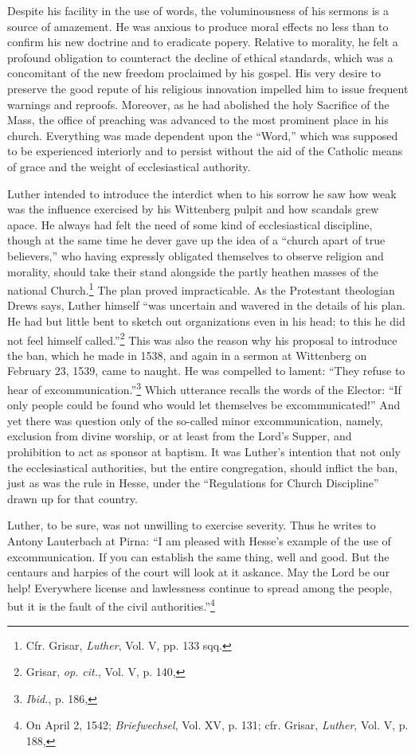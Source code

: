 Despite his facility in the use of words, the voluminousness of his
sermons is a source of amazement. He was anxious to produce moral
effects no less than to confirm his new doctrine and to eradicate popery.
Relative to morality, he felt a profound obligation to counteract the
decline of ethical standards, which was a concomitant of the
new freedom proclaimed by his gospel. His very desire to preserve the
good repute of his religious innovation impelled him to issue frequent
warnings and reproofs. Moreover, as he had abolished the holy Sacrifice
of the Mass, the office of preaching was advanced to the most
prominent place in his church. Everything was made dependent
upon the “Word,” which was supposed to be experienced interiorly
and to persist without the aid of the Catholic means of grace and the
weight of ecclesiastical authority.

Luther intended to introduce the interdict when to his sorrow he
saw how weak was the influence exercised by his Wittenberg pulpit
and how scandals grew apace. He always had felt the need of some
kind of ecclesiastical discipline, though at the same time he dever
gave up the idea of a “church apart of true believers,” who having
expressly obligated themselves to observe religion and morality,
should take their stand alongside the partly heathen masses of the
national Church.\footnote{Cfr. Grisar, \textit{Luther}, Vol. V, pp. 133 sqq.}
The plan proved impracticable. As the Protestant
theologian Drews says, Luther himself “was uncertain and
wavered in the details of his plan. He had but little bent to sketch out
organizations even in his head; to this he did not feel himself
called.”\footnote{Grisar, \textit{op. cit.}, Vol. V, p. 140,}
This was also the reason why his proposal to introduce the
ban, which he made in 1538, and again in a sermon at Wittenberg
on February 23, 1539, came to naught. He was compelled to lament:
“They refuse to hear of excommunication.”\footnote{\textit{Ibid.}, p. 186,}
Which utterance recalls
the words of the Elector: “If only people could be found who would
let themselves be excommunicated!” And yet there was question only
of the so-called minor excommunication, namely, exclusion from
divine worship, or at least from the Lord’s Supper, and prohibition to
act as sponsor at baptism. It was Luther’s intention that not only the
ecclesiastical authorities, but the entire congregation, should inflict the
ban, just as was the rule in Hesse, under the “Regulations for Church
Discipline” drawn up for that country.

Luther, to be sure, was not unwilling to exercise severity. Thus he
writes to Antony Lauterbach at Pirna: “I am pleased with Hesse’s
example of the use of excommunication. If you can establish the same
thing, well and good. But the centaurs and harpies of the court will
look at it askance. May the Lord be our help! Everywhere license and
lawlessness continue to spread among the people, but it is the fault of
the civil authorities.”\footnote{On April 2, 1542; \textit{Briefwechsel}, Vol. XV, p. 131; cfr. Grisar, \textit{Luther}, Vol. V, p. 188,}


